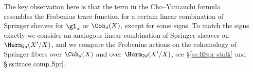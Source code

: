 
The key observation here is that the term in the Cho--Yamauchi formula resembles the Frobenius trace function for a certain linear combination of Springer sheaves for $\gl_{d}$ or $\Coh_{d}(X)$, except for some signs. To match the signs exactly we consider an analogous linear combination of Springer sheaves on $\Herm_{2d}(X'/X)$, and we compare the Frobenius actions on the cohomology of Springer fibers over $\Coh_{d}(X)$ and over $\Herm_{2d}(X'/X)$, see \S\ref{ss:HSpr stalk} and \S\ref{ss:trace comp Spr}.

